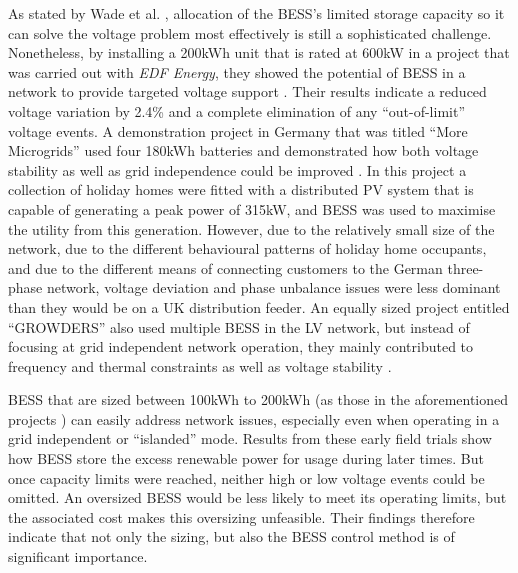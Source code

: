 As stated by Wade et al. \cite{Wade2009}, allocation of the BESS's limited storage capacity so it can solve the voltage problem most effectively is still a sophisticated challenge.
Nonetheless, by installing a 200kWh unit that is rated at 600kW in a project that was carried out with \textit{EDF Energy}, they showed the potential of BESS in a network to provide targeted voltage support \cite{Wade2010}.
Their results indicate a reduced voltage variation by 2.4\% and a complete elimination of any ``out-of-limit'' voltage events.
A demonstration project in Germany that was titled ``More Microgrids'' used four 180kWh batteries and demonstrated how both voltage stability as well as grid independence could be improved \cite{Overbeeke2010}.
In this project a collection of holiday homes were fitted with a distributed PV system that is capable of generating a peak power of 315kW, and BESS was used to maximise the utility from this generation.
However, due to the relatively small size of the network, due to the different behavioural patterns of holiday home occupants, and due to the different means of connecting customers to the German three-phase network, voltage deviation and phase unbalance issues were less dominant than they would be on a UK distribution feeder.
An equally sized project entitled ``GROWDERS'' also used multiple BESS in the LV network, but instead of focusing at grid independent network operation, they mainly contributed to frequency and thermal constraints as well as voltage stability \cite{GROWDERS2011}.

BESS that are sized between 100kWh to 200kWh (as those in the aforementioned projects \cite{Wade2010, Wade2009, Overbeeke2010, GROWDERS2011}) can easily address network issues, especially even when operating in a grid independent or ``islanded'' mode.
Results from these early field trials show how BESS store the excess renewable power for usage during later times.
But once capacity limits were reached, neither high or low voltage events could be omitted.
An oversized BESS would be less likely to meet its operating limits, but the associated cost makes this oversizing unfeasible.
Their findings therefore indicate that not only the sizing, but also the BESS control method is of significant importance.


